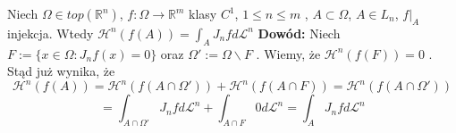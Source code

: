 \begin{tw}
	Niech $\Omega \in top(\mathbb{R}^n)$, $f: \Omega \rightarrow \mathbb{R}^m$ klasy $C^1$, $1 \leq n \leq m$  , $A \subset \Omega$, $A \in L_n$, $f|_A$ injekcja. Wtedy $\mathcal{H}^n(f(A)) = \int_A J_nf d \mathcal{L}^n$  
	\newline\newline
	\textbf{Dowód:}\newline
	Niech $F := \{x \in \Omega: J_nf(x) = 0\}$ oraz $\Omega' := \Omega \backslash F$ . Wiemy, że $\mathcal{H}^n(f(F)) = 0$ . Stąd już wynika, że 
	$$
		\mathcal{H}^n(f(A)) = \mathcal{H}^n(f(A \cap \Omega')) + \mathcal{H}^n(f(A \cap F)) = \mathcal{H}^n(f(A \cap \Omega')) 
	$$
	$$
		= \int_{A \cap \Omega'} J_nf d \mathcal{L}^n + \int_{A \cap F} 0 d \mathcal{L}^n = \int_{A} J_nf d \mathcal{L}^n
	$$ 
\end{tw}